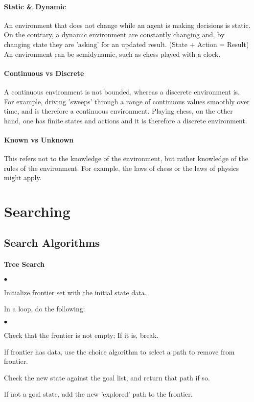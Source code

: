 \documentclass[11pt,letterpaper]{article}
\newcommand{\squishlist}{
 \begin{list}{$\bullet$}
  { \setlength{\itemsep}{0pt}
     \setlength{\parsep}{3pt}
     \setlength{\topsep}{3pt}
     \setlength{\partopsep}{0pt}
     \setlength{\leftmargin}{1.5em}
     \setlength{\labelwidth}{1em}
     \setlength{\labelsep}{0.5em} } }
\newcommand{\squishend}{
  \end{list}  }
\begin{document}
\paragraph{Static \& Dynamic}
An environment that does not change while an agent is making decisions is static. On the contrary, a dynamic environment are constantly changing and, by changing state they are 'asking' for an updated result. (State + Action = Result)
An environment can be semidynamic, such as chess played with a clock.

\paragraph{Continuous vs Discrete}
A continuous environment is not bounded, whereas a discerete environment is. For example, driving 'sweeps' through a range of continuous values smoothly over time, and is therefore a continuous environment. Playing chess, on the other hand, one has finite states and actions and it is therefore a discrete environment.

\paragraph{Known vs Unknown}
This refers not to the knowledge of the environment, but rather knowledge of the rules of the environment. For example, the laws of chess or the laws of physics might apply.



\section{Searching}

\subsection{Search Algorithms}
\paragraph{Tree Search}
\squishlist
\item Initialize frontier set with the initial state data. 
\item In a loop, do the following: \\[-.3cm]
\squishlist
\item Check that the frontier is not empty; If it is, break. \\[-.3cm]
\item If frontier has data, use the choice algorithm to select a path to remove from frontier. \\[-.3cm]
\item Check the new state against the goal list, and return that path if so. \\[-.3cm]
\item If not a goal state, add the new 'explored' path to the frontier. \\[-.3cm]
\squishend
\squishend
\end{document}
